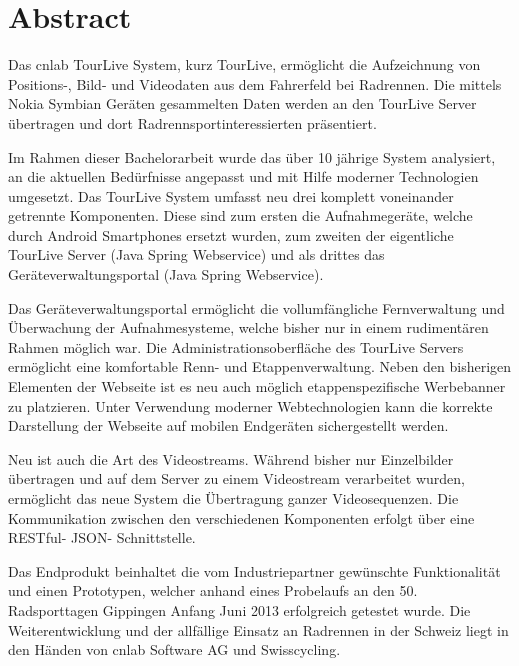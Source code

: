 \chapter*{Abstract}
Das cnlab TourLive System, kurz TourLive, ermöglicht die Aufzeichnung von Positions-, Bild- und Videodaten aus dem Fahrerfeld bei Radrennen. Die mittels Nokia Symbian Geräten gesammelten Daten werden an den TourLive Server übertragen und dort Radrennsportinteressierten präsentiert.



Im Rahmen dieser Bachelorarbeit wurde das über 10 jährige System analysiert, an die aktuellen Bedürfnisse angepasst und mit Hilfe moderner Technologien umgesetzt. Das TourLive System umfasst neu drei komplett voneinander getrennte Komponenten. Diese sind zum ersten die Aufnahmegeräte, welche durch Android Smartphones ersetzt wurden, zum zweiten der eigentliche TourLive Server (Java Spring Webservice) und als drittes das Geräteverwaltungsportal (Java Spring Webservice). 


Das Geräteverwaltungsportal ermöglicht die vollumfängliche Fernverwaltung und Überwachung der Aufnahmesysteme, welche bisher nur in einem rudimentären Rahmen möglich war. Die Administrationsoberfläche des TourLive Servers ermöglicht eine komfortable Renn- und Etappenverwaltung. Neben den bisherigen Elementen der Webseite ist es neu auch möglich etappenspezifische Werbebanner zu platzieren. Unter Verwendung moderner Webtechnologien kann die korrekte  Darstellung der Webseite auf mobilen Endgeräten sichergestellt werden.


Neu ist auch die Art des Videostreams. Während bisher nur Einzelbilder übertragen und auf dem Server zu einem Videostream verarbeitet wurden, ermöglicht das neue System die Übertragung ganzer Videosequenzen. Die Kommunikation zwischen den verschiedenen Komponenten erfolgt über eine RESTful- JSON- Schnittstelle. 


Das Endprodukt beinhaltet die vom Industriepartner gewünschte Funktionalität und einen Prototypen, welcher anhand eines Probelaufs an den 50. Radsporttagen Gippingen Anfang Juni 2013 erfolgreich getestet wurde. Die Weiterentwicklung und der allfällige Einsatz an Radrennen in der Schweiz liegt in den Händen von cnlab Software AG und Swisscycling.
